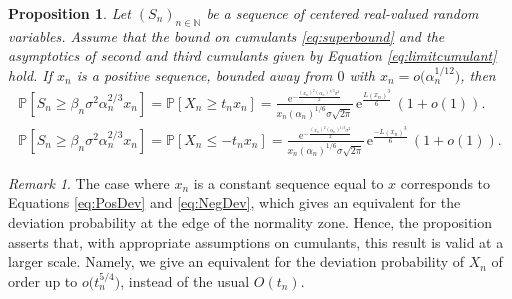 \documentclass[12pt,a4paper,reqno]{amsart}
\newtheorem{proposition}[lemma]{Proposition}
\theoremstyle{remark}
\newtheorem{remark}[lemma]{Remark}
\newcommand{\N}{\mathbb{N}}
\newcommand{\E}{\mathrm{e}}
\newcommand{\proba}{\mathbb{P}}
\newcommand{\alphan}{\alpha_n}
\newcommand{\betan}{\beta_n}
\begin{document}
\begin{proposition}\label{prop:largedeviationscumulants}
Let $(S_{n})_{n \in \N}$ be a sequence of centered real-valued random variables.
Assume that the bound on cumulants \eqref{eq:superbound} and the asymptotics of second and third cumulants given by Equation \eqref{eq:limitcumulant} hold.
If $x_n$ is a positive sequence, bounded away from $0$ with $x_n=o\big(\alphan^{1/12} \big)$, then
\begin{align*}
    \proba\!\left[S_{n} \geq \betan \sigma^2 \alphan^{2/3} x_n \right]=
\proba[X_n \ge t_n x_n] =
\frac{\E^{-\frac{(x_n)^2(\alphan)^{1/3}\sigma^2}{2}}}{x_n(\alphan)^{1/6}\sigma \sqrt{2\pi}}\,\E^{\frac{L(x_n)^3}{6}}\,(1+o(1)).\\
    \proba\!\left[S_{n} \geq \betan \sigma^2 \alphan^{2/3} x_n \right]=
\proba[X_n \le - t_n x_n] =
\frac{\E^{-\frac{(x_n)^2(\alphan)^{1/3}\sigma^2}{2}}}{x_n(\alphan)^{1/6}\sigma \sqrt{2\pi}}\,\E^{\frac{-L(x_n)^3}{6}}\,(1+o(1)).
\end{align*}
\end{proposition}

\begin{remark}
The case where $x_n$ is a constant sequence equal to $x$ corresponds to Equations \eqref{eq:PosDev} and \eqref{eq:NegDev}, 
which gives an equivalent for the deviation probability at the edge of the normality zone.
Hence, the proposition asserts that, with appropriate assumptions on cumulants,
this result is valid at a larger scale.
Namely, we give an equivalent for the deviation probability of $X_n$ of order up to $o\big( t_n^{5/4}\big)$,
instead of the usual $O(t_n)$.
\end{remark}
\end{document}
